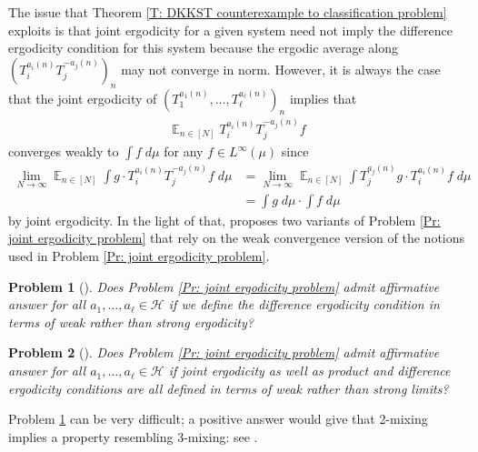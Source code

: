 \documentclass[11pt]{amsart}
\newtheorem{problem}{Problem}
\theoremstyle{definition}
\DeclareMathOperator*{\E}{\mathbb{E}}
\newcommand{\CH}{{\mathcal H}}
\newcommand{\1}{{\mathbf{1}}}
\begin{document}
The issue that Theorem \ref{T: DKKST counterexample to classification problem} exploits is that joint ergodicity for a given system need not imply the difference ergodicity condition for this system because the ergodic average along $(T_i^{a_i(n)}T_j^{-a_j(n)})_n$ may not converge in norm. However, it is always the case that the joint ergodicity of $(T_1^{a_1(n)}, \ldots, T_\ell^{a_\ell(n)})_n$ implies that 
\begin{align}
    \E_{n\in[N]}T_i^{a_i(n)}T_j^{-a_j(n)} f
\end{align} 
converges weakly to $\int f\; d\mu$ for any $f\in L^\infty(\mu)$ since
\begin{align*}
    \lim_{N\to\infty}\E_{n\in[N]}\int g\cdot T_i^{a_i(n)}T_j^{-a_j(n)} f\; d\mu &= \lim_{N\to\infty}\E_{n\in[N]}\int T_j^{a_j(n)}g\cdot T_i^{a_i(n)} f\; d\mu\\
    &= \int g\; d\mu \cdot \int f\; d\mu
\end{align*}
by joint ergodicity. In the light of that, \cite{DKKST25} proposes two variants of Problem \ref{Pr: joint ergodicity problem} that rely on the weak convergence version of the notions used in Problem \ref{Pr: joint ergodicity problem}. 
\begin{problem}[{\cite[Question 8.3]{DKKST25}}]\label{Pr: mending joint ergodicity problem 1}
    Does Problem \ref{Pr: joint ergodicity problem} admit affirmative answer for all $a_1, \ldots, a_\ell\in\CH$ if we define the difference ergodicity condition in terms of weak rather than strong ergodicity?
\end{problem}

\begin{problem}[{\cite[Question 8.4]{DKKST25}}]\label{Pr: mending joint ergodicity problem 2}
    Does Problem \ref{Pr: joint ergodicity problem} admit affirmative answer for all $a_1, \ldots, a_\ell\in\CH$ if joint ergodicity as well as product and difference ergodicity conditions are all defined in terms of weak rather than strong limits?
\end{problem}


Problem \ref{Pr: mending joint ergodicity problem 1} can be very difficult; a positive answer would give that 2-mixing implies a property resembling 3-mixing: see \cite[Proposition 8.5]{DKKST25}.
\end{document}
